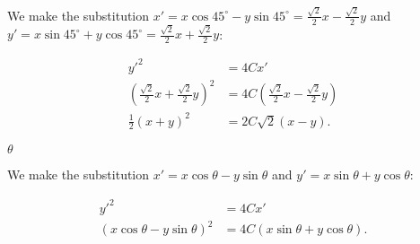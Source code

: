 \documentclass[../gatm_answers.tex]{subfiles}
\begin{document}
\noindent We make the substitution $x'=x \cos 45^\circ - y\sin 45^\circ=\frac{\sqrt{2}}{2}x-\frac{\sqrt{2}}{2}y$ and $y'=x\sin 45^\circ + y\cos 45^\circ=\frac{\sqrt{2}}{2}x+\frac{\sqrt{2}}{2}y$:

\begin{align*}
y'^2&=4Cx' \\
\left(\frac{\sqrt{2}}{2}x+\frac{\sqrt{2}}{2}y\right)^2 &= 4C\left(\frac{\sqrt{2}}{2}x-\frac{\sqrt{2}}{2}y\right) \\
\frac{1}{2}(x+y)^2 &= 2C\sqrt{2}(x-y).
\end{align*}

\begin{iinner_problem}
\item $\theta$
\end{iinner_problem}

We make the substitution $x'=x \cos \theta - y\sin \theta$ and $y'=x\sin \theta + y\cos \theta$:

\begin{align*}
y'^2&=4Cx' \\
\left(x \cos \theta - y\sin \theta\right)^2 &= 4C\left(x\sin \theta + y\cos \theta\right).
\end{align*}
\end{document}
